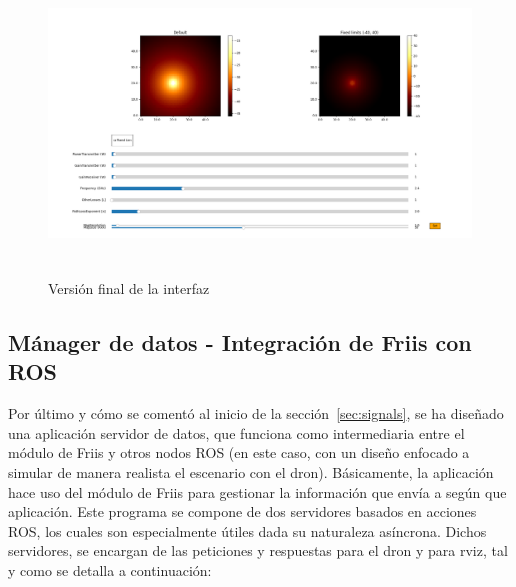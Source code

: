 \begin{figure} [t]
    \begin{center}
    \includegraphics[height=8cm]{imagenes/cap4/7_Friss_endGUI.png}
    \end{center}
	\caption[Versión final de la interfaz]{Versión final de la interfaz}
	\label{fig:friis_end_app}
\end{figure}

\subsection{Mánager de datos - Integración de Friis con \ac{ROS}}
\label{subsec:friis-ros}

Por último y cómo se comentó al inicio de la sección~\ref{sec:signals}, se ha diseñado una aplicación servidor de datos, que funciona como intermediaria entre el módulo de Friis y otros nodos \ac{ROS} (en este caso, con un diseño enfocado a simular de manera realista el escenario con el dron). Básicamente, la aplicación hace uso del módulo de Friis para gestionar la información que envía a según que aplicación. Este programa se compone de dos servidores basados en acciones \ac{ROS}, los cuales son especialmente útiles dada su naturaleza asíncrona. Dichos servidores, se encargan de las peticiones y respuestas para el dron y para rviz, tal y como se detalla a continuación:

